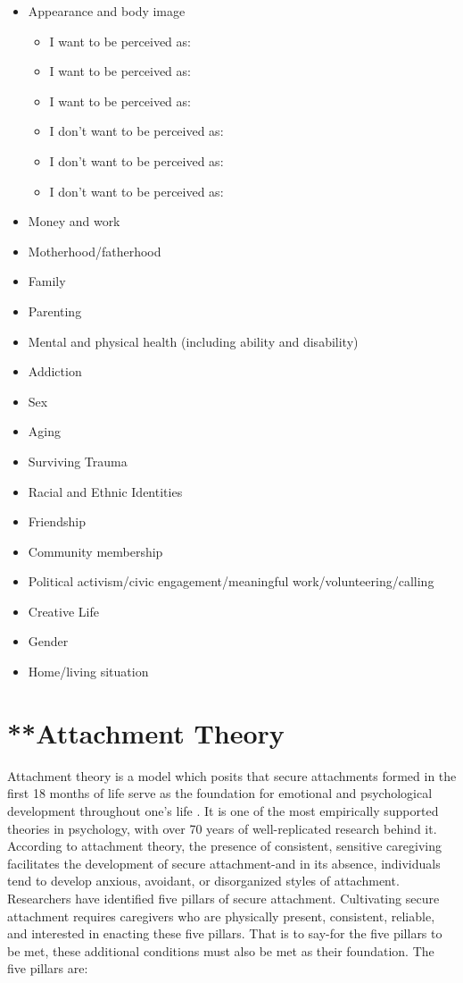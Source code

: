 \documentclass[12pt,letterpaper]{book}
\begin{document}
\begin{itemize}
    \item Appearance and body image
    \begin{itemize}
        \item I want to be perceived as:
        \item I want to be perceived as:
        \item I want to be perceived as:
        \item I don't want to be perceived as:
        \item I don't want to be perceived as:
        \item I don't want to be perceived as:
    \end{itemize}
    \item Money and work
    \item Motherhood/fatherhood
    \item Family
    \item Parenting
    \item Mental and physical health (including ability and disability)
    \item Addiction
    \item Sex
    \item Aging
    \item Surviving Trauma
    \item Racial and Ethnic Identities
    \item Friendship
    \item Community membership
    \item Political activism/civic engagement/meaningful work/volunteering/calling
    \item Creative Life
    \item Gender
    \item Home/living situation
\end{itemize}
\chapter{**Attachment Theory}
\label{attachment}
Attachment theory is a model which posits that secure attachments formed in the first 18 months of life serve as the foundation for emotional and psychological development throughout one's life \cite{brownAttachmentDisturbances}. It is one of the most empirically supported theories in psychology, with over 70 years of well-replicated research behind it. According to attachment theory, the presence of consistent, sensitive caregiving facilitates the development of secure attachment-and in its absence, individuals tend to develop anxious, avoidant, or disorganized styles of attachment. Researchers have identified five pillars of secure attachment. Cultivating secure attachment requires caregivers who are physically present, consistent, reliable, and interested in enacting these five pillars. That is to say-for the five pillars to be met, these additional conditions must also be met as their foundation. The five pillars are:
\end{document}
